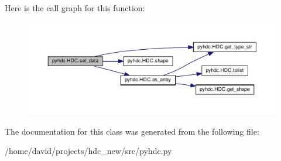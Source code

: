 Here is the call graph for this function\+:\nopagebreak
\begin{figure}[H]
\begin{center}
\leavevmode
\includegraphics[width=350pt]{classpyhdc_1_1_h_d_c_a42b5d61d63e3ff6c9a0824eeaa5af88d_cgraph}
\end{center}
\end{figure}




The documentation for this class was generated from the following file\+:\begin{DoxyCompactItemize}
\item 
/home/david/projects/hdc\+\_\+new/src/pyhdc.\+py\end{DoxyCompactItemize}
